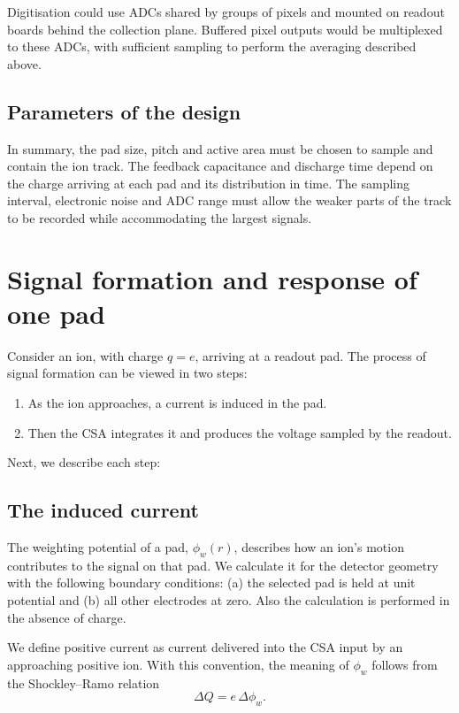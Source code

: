 \documentclass[11pt,a4paper]{article}
\begin{document}
Digitisation could use ADCs shared by groups of pixels and mounted on readout boards behind the collection plane. Buffered pixel outputs would be multiplexed to these ADCs, with sufficient sampling to perform the averaging described above.

\subsection{Parameters of the design}

In summary, the pad size, pitch and active area must be chosen to sample and contain the ion track. The feedback capacitance and discharge time depend on the charge arriving at each pad and its distribution in time. The sampling interval, electronic noise and ADC range must allow the weaker parts of the track to be recorded while accommodating the largest signals.


\section{Signal formation and response of one pad}
\label{sec:single_ion}

Consider an ion, with charge $q=e$, arriving at a readout pad. The process of signal formation can be viewed in two steps:
\begin{enumerate}
\item As the ion approaches, a current is induced in the pad. 
\item Then the CSA integrates it and produces the voltage sampled by the readout.
\end{enumerate}

Next, we describe each step:

\subsection{The induced current}

The weighting potential of a pad, $\phi_{w}(r)$, describes how an ion’s motion contributes to the signal on that pad. We calculate it for the detector geometry with the following boundary conditions: (a) the selected pad is held at unit potential and (b) all other electrodes at zero. Also the calculation is performed in the absence of charge. 

We define positive current as current delivered into the CSA input by an approaching positive ion. With this convention, the meaning of $\phi_w$ follows from the Shockley--Ramo relation~\cite{riegler2016}
\begin{equation}
 \Delta Q=e\,\Delta\phi_w.
 \label{eq:single_charge}
\end{equation}
\end{document}
